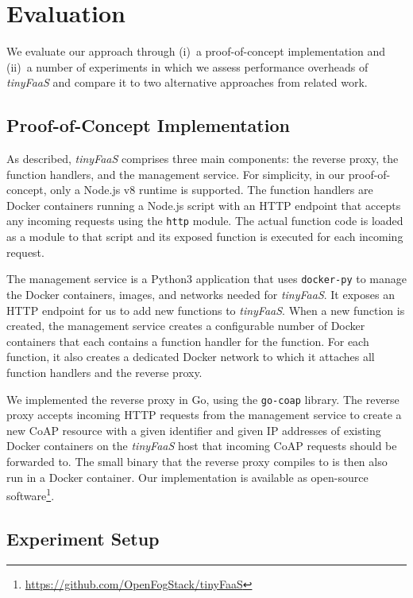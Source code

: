 \section{Evaluation}
\label{cha:evaluation}

We evaluate our approach through (i)~a proof-of-concept implementation and (ii)~a number of experiments in which we assess performance overheads of \textit{tinyFaaS} and compare it to two alternative approaches from related work.

\subsection{Proof-of-Concept Implementation}
\label{sec:implementation}

As described, \textit{tinyFaaS} comprises three main components: the reverse proxy, the function handlers, and the management service.
For simplicity, in our proof-of-concept, only a Node.js v8 runtime is supported.
The function handlers are Docker containers running a Node.js script with an HTTP endpoint that accepts any incoming requests using the \texttt{http} module.
The actual function code is loaded as a module to that script and its exposed function is executed for each incoming request.

The management service is a Python3 application that uses \texttt{docker-py} to manage the Docker containers, images, and networks needed for \textit{tinyFaaS}.
It exposes an HTTP endpoint for us to add new functions to \textit{tinyFaaS}.
When a new function is created, the management service creates a configurable number of Docker containers that each contains a function handler for the function.
For each function, it also creates a dedicated Docker network to which it attaches all function handlers and the reverse proxy.

We implemented the reverse proxy in Go, using the \texttt{go-coap} library.
The reverse proxy accepts incoming HTTP requests from the management service to create a new CoAP resource with a given identifier and given IP addresses of existing Docker containers on the \textit{tinyFaaS} host that incoming CoAP requests should be forwarded to.
The small binary that the reverse proxy compiles to is then also run in a Docker container.
Our implementation is available as open-source software\footnote{\url{https://github.com/OpenFogStack/tinyFaaS}}.

\subsection{Experiment Setup}
\label{sec:experiment}



